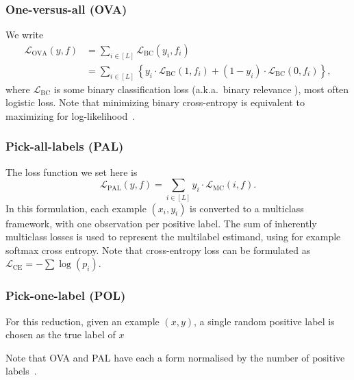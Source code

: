 \subsubsection*{One-versus-all (OVA)}
We write
%
\begin{equation}
\begin{aligned}
\mathcal{L}_{\mathrm{OVA}}(y, f) &= \sum_{i \in[L]} \mathcal{L}_{\mathrm{BC}}\left(y_{i}, f_{i}\right)\\
&=\sum_{i \in[L]}\left\{y_{i} \cdot \mathcal{L}_{\mathrm{BC}}\left(1, f_{i}\right)+\left(1-y_{i}\right) \cdot \mathcal{L}_{\mathrm{BC}}\left(0, f_{i}\right)\right\},
\end{aligned}
\end{equation}
%
where $\mathcal{L}_{\mathrm{BC}}$ is some binary classification loss (a.k.a.\ binary relevance \cite{OVA1, hammingLoss, OVA2}), most often logistic loss.  Note that minimizing binary cross-entropy is equivalent to maximizing for log-likelihood~\cite[Section 4.3.4]{Bishop}.

\subsubsection*{Pick-all-labels (PAL)}
The loss function we set here is
%
\begin{equation}
\mathcal{L}_{\mathrm{PAL}}(y, f) = \sum_{i \in[L]} y_{i} \cdot \mathcal{L}_{\mathrm{MC}}(i, f).
\end{equation}
%
In this formulation, each example $(x_i, y_i)$ is converted to a multiclass framework, with one observation per positive label. The sum of inherently multiclass losses is used to represent the multilabel estimand, using for example softmax cross entropy. Note that cross-entropy loss can be formulated as \(\mathcal{L}_{\text {CE}}=-\sum \log \left(p_{i}\right)\).

\subsubsection*{Pick-one-label (POL)}

For this reduction, given an example $(x,y)$, a single random positive label is chosen as the true label of $x$

\vspace{\baselineskip}

Note that OVA and PAL have each a form normalised by the number of positive labels~\cite{multilabelReduction}.

